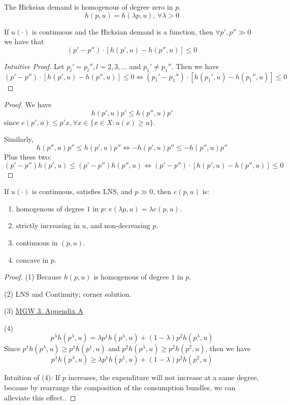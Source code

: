 \begin{proposition}
    The Hicksian demand is homogenous of degree zero in $p$. \[
        h(p,u) = h(\lambda p, u), \, \forall \lambda > 0
    \]
\end{proposition}

\begin{proposition}
    If $u(\cdot )$ is continuous and the Hicksian demand is a function, then $\forall p',p'' \gg 0$ we have that \[
        (p'-p'')\cdot [h(p',u) - h(p'',u)] \leq 0
    \]
\end{proposition}

\begin{proof}
    [Intuitive Proof]
    Let $p_l' = p_l'', l = 2,3,\dots$ and $p_1' \neq p_1''$. Then we have \[
        (p'-p'')\cdot [h(p',u) - h(p'',u)] \leq 0 \iff (p_1'-p_1'')\cdot [h(p_1',u) - h(p_1'',u)] \leq 0
    \]
\end{proof}

\begin{proof} We have
    \[
        h(p',u) p' \leq h(p'',u)p'
    \] since $e(p',u) \leq p'x, \forall x \in \{x \in X: u(x) \geq u\}$.

    Similarly, \[
        h(p'',u) p'' \leq h(p',u) p'' \iff - h(p',u) p'' \leq - h(p'',u) p''
    \]
    Plus these two: \[
        (p'-p'')h(p',u) \leq (p'-p'')h(p'',u) \iff (p'-p'')\cdot [h(p',u) - h(p'',u)] \leq 0
    \]
\end{proof}

\begin{proposition}
    If $u(\cdot )$ is continuous, satisfies LNS, and $p \gg 0$, then $e(p,u)$ is: \begin{enumerate}
        \item homogenous of degree $1$ in $p$: $e(\lambda p,u) = \lambda e(p,u)$.
        \item strictly increasing in $u$, and non-decreasing $p$.
        \item continuous in $(p,u)$.
        \item concave in $p$.
    \end{enumerate}
\end{proposition}

\begin{proof}
    (1) Because $h(p,u)$ is homogenous of degree $1$ in $p$.

    (2) LNS and Continuity; corner solution.

    (3) \underline{MGW 3. Appendix A}

    (4) \[
        p^\lambda h(p^\lambda,u) = \lambda p^1 h(p^\lambda, u) + (1-\lambda)p^2 h(p^\lambda, u)
    \]
    Since $p^1 h(p^\lambda, u) \geq p^1 h(p^1,u)$ and $p^2 h(p^\lambda,u) \geq p^2 h(p^2,u)$, then we have \[
        p^\lambda h(p^\lambda,u) \geq  \lambda p^1 h(p^1, u) + (1-\lambda)p^2 h(p^2, u)
    \]

    Intuition of (4): If $p$ increases, the expenditure will not increase at a same degree, because by rearrange the composition of the consumption bundles, we can alleviate this effect..
\end{proof}

